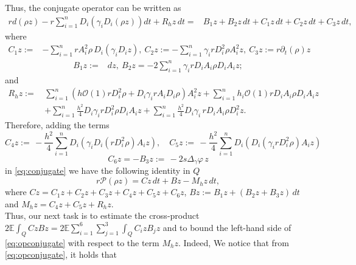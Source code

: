 \documentclass[11pt,oneside,leqno]{amsart}
\numberwithin{equation}{section}
\numberwithin{equation}{section}
\newcommand{\E}{\mathbb{E}}
\begin{document}
Thus, the conjugate operator can be written as
 \begin{equation}\label{eq:conjugate}
\begin{split}
rd(\rho z)-r\sum_{i=1}^{n}D_{i}\left(\gamma_{i}D_{i}(\rho z)\right)dt+R_{h}z\,dt=&B_1z+B_2z\,dt+C_1z\,dt+C_2z\,dt+C_3z\,dt,
\end{split}
\end{equation}
where 
\begin{equation*}
    \begin{split}
        C_{1}z:=&-\sum_{i=1}^{n}rA_{i}^{2}\rho\,D_{i}(\gamma_{i}D_{i}z),\ C_{2}z:=-\sum_{i=1}^{n}\gamma_{i}rD_{i}^{2}\rho A_{i}^{2}z,\ C_{3}z:=r\partial_t(\rho) z
    \end{split}
\end{equation*}
\begin{equation*}
    \begin{split}
        B_1z:=& dz,\ B_2z=-2\sum_{i=1}^{n}\gamma_{i}rD_{i}A_{i}\rho D_{i}A_{i}z;
    \end{split}
\end{equation*}
and
\begin{equation*}
    \begin{split}
        R_{h}z:=\,&\sum_{i=1}^{n}\left(h\mathcal{O}(1)rD_{i}^{2}\rho +D_{i}\gamma_{i}rA_{i}D_{i}\rho\right)A_{i}^{2}z+\sum_{i=1}^{n}h_{i}\mathcal{O}(1)rD_{i}A_{i}\rho D_{i}A_{i}z\\
        &+\sum_{i=1}^{n}\frac{h^{2}}{4}D_{i}\gamma_{i}rD_{i}^{2}\rho D_{i}A_{i}z+\sum_{i=1}^{n}\frac{h^{2}}{4}D_{i}\gamma_i \,rD_{i}A_{i}\rho D_{i}^{2}z.
    \end{split} 
\end{equation*}
 Therefore, adding the terms $$C_4z:=\,-\frac{h^2}{4}\sum_{i=1}^{n}D_i(\gamma_i D_i(rD_i^2\rho)A_iz),\quad C_5z:=\,-\frac{h^2}{4}\sum_{i=1}^{n}D_i(D_i(\gamma_irD^2_i\rho)A_iz)$$ 
  $$ C_{6}z=-B_3z:=\,-2s\Delta_{\gamma}\varphi\, z$$
 in \eqref{eq:conjugate} we have the following identity in $Q$
\begin{equation}\label{eq:opconjugate}
    r\mathcal{P}(\rho z)=Cz\,dt+Bz-M_{h} z\,dt,
\end{equation}
where $Cz=C_{1}z+C_{2}z+C_3z+C_4z+C_5z+C_6z$, $Bz:=B_1z+(B_{2}z+B_3z)
\,dt$ and $M_{h}z=C_4z+C_5z+R_hz$.\\
Thus, our next task is to estimate the cross-product $\displaystyle 2\E \int_Q CzBz =2\E \sum_{i=1}^{6}\sum_{j=1}^{3}\int_Q C_{i}zB_{j}z$ and to bound the left-hand side of \eqref{eq:opconjugate} with respect to the term $M_h z$. Indeed, 
We notice that from \eqref{eq:opconjugate}, it holds that
\end{document}
